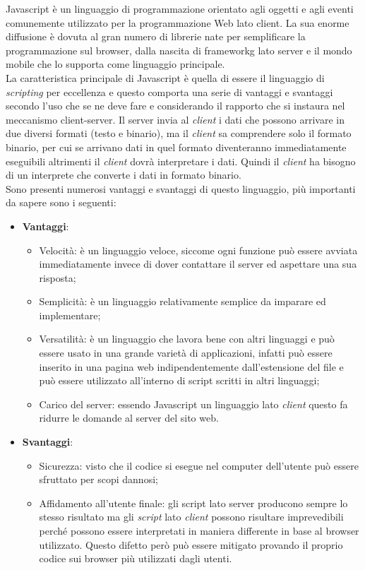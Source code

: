 Javascript è un linguaggio di programmazione orientato agli oggetti e agli eventi comunemente utilizzato per la programmazione Web lato client. La sua enorme diffusione è dovuta al gran numero di librerie nate per semplificare la programmazione sul browser, dalla nascita di \gls{frameworkg} lato server e il mondo mobile che lo supporta come linguaggio principale.\\
La caratteristica principale di Javascript è quella di essere il linguaggio di \textit{scripting} per eccellenza e questo comporta una serie di vantaggi e svantaggi secondo l'uso che se ne deve fare e considerando il rapporto che si instaura nel meccanismo client-server. Il server invia al \textit{client} i dati che possono arrivare in due diversi formati (testo e binario), ma il \textit{client} sa comprendere solo il formato binario, per cui se arrivano dati in quel formato diventeranno immediatamente eseguibili altrimenti il \textit{client} dovrà interpretare i dati. Quindi il \textit{client} ha bisogno di un interprete che converte i dati in formato binario.\\
Sono presenti numerosi vantaggi e svantaggi di questo linguaggio, più importanti da sapere sono i seguenti:
\begin{itemize}
	\item \textbf{Vantaggi}:
	\begin{itemize}
		\item Velocità: è un linguaggio veloce, siccome ogni funzione può essere avviata immediatamente invece di dover contattare il server ed aspettare una sua risposta;
		\item Semplicità: è un linguaggio relativamente semplice da imparare ed implementare;
		\item Versatilità: è un linguaggio che lavora bene con altri linguaggi e può essere usato in una grande varietà di applicazioni, infatti può essere inserito in una pagina web indipendentemente dall'estensione del file e può essere utilizzato all'interno di script scritti in altri linguaggi;
		\item Carico del server: essendo Javascript un linguaggio lato \textit{client} questo fa ridurre le domande al server del sito web.
	\end{itemize}
	\item \textbf{Svantaggi}:
	\begin{itemize}
		\item Sicurezza: visto che il codice si esegue nel computer dell'utente può essere sfruttato per scopi dannosi;
		\item Affidamento all'utente finale: gli script lato server producono sempre lo stesso risultato ma gli \textit{script} lato \textit{client} possono risultare imprevedibili perché possono essere interpretati in maniera differente in base al browser utilizzato. Questo difetto però può essere mitigato provando il proprio codice sui browser più utilizzati dagli utenti.
	\end{itemize}
\end{itemize}

